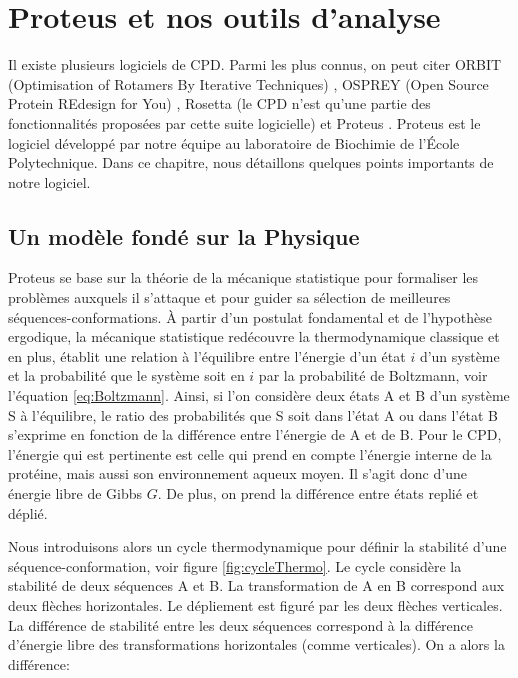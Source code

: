 \chapter{Proteus et nos outils d'analyse}
\label{chap:methodes}

Il existe plusieurs logiciels de CPD. Parmi les plus connus, on peut citer ORBIT (Optimisation of Rotamers By Iterative Techniques) \cite{Dahiyat96}, OSPREY (Open Source Protein REdesign for You) \cite{Gainza13}, Rosetta (le CPD n'est qu'une partie des fonctionnalités proposées par cette suite logicielle) \cite{Kuhlman03} et Proteus \cite{Simonson13,Polydorides16}. Proteus est le logiciel développé par notre équipe au laboratoire de Biochimie de l'École Polytechnique. Dans ce chapitre, nous détaillons quelques points importants de notre logiciel.  

\section{Un modèle fondé sur la Physique}
\label{sec:Phy}
Proteus se base sur la théorie de la mécanique statistique pour formaliser les problèmes auxquels il s'attaque et pour guider sa sélection de meilleures séquences-conformations. À partir d'un postulat fondamental et de l'hypothèse ergodique, la mécanique statistique \og redécouvre \fg la thermodynamique classique et en plus, établit une relation à l'équilibre entre l'énergie d'un état $i$ d'un système et la probabilité que le système soit en $i$ par la probabilité de Boltzmann, voir l'équation \vref{eq:Boltzmann}. Ainsi, si l'on considère deux états A et B d'un système S à l'équilibre, le ratio des probabilités que S soit dans l'état A ou dans l'état B s'exprime en fonction de la différence entre l'énergie de A et de B. Pour le CPD, l'énergie qui est pertinente est celle qui prend en compte l'énergie interne de la protéine, mais aussi son environnement aqueux moyen. Il s'agit donc d'une énergie libre de Gibbs $G$. De plus, on prend la différence entre états replié et déplié.

Nous introduisons alors un cycle thermodynamique pour définir la stabilité d'une séquence-conformation, voir figure \ref{fig:cycleThermo}. Le cycle considère la stabilité de deux séquences A et B. La transformation de A en B correspond aux deux flèches horizontales. Le dépliement est figuré par les deux flèches verticales. La différence de stabilité entre les deux séquences correspond à la différence d'énergie libre des transformations horizontales (comme verticales). On a alors la différence: 

